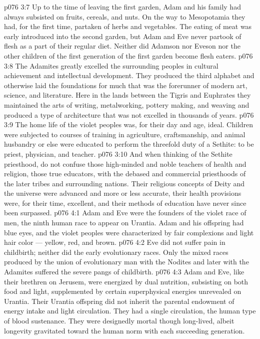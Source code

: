 \vs p076 3:7 Up to the time of leaving the first garden, Adam and his family had always subsisted on fruits, cereals, and nuts. On the way to Mesopotamia they had, for the first time, partaken of herbs and vegetables. The eating of meat was early introduced into the second garden, but Adam and Eve never partook of flesh as a part of their regular diet. Neither did Adamson nor Eveson nor the other children of the first generation of the first garden become flesh eaters.
\vs p076 3:8 \pc The Adamites greatly excelled the surrounding peoples in cultural achievement and intellectual development. They produced the third alphabet and otherwise laid the foundations for much that was the forerunner of modern art, science, and literature. Here in the lands between the Tigris and Euphrates they maintained the arts of writing, metalworking, pottery making, and weaving and produced a type of architecture that was not excelled in thousands of years.
\vs p076 3:9 The home life of the violet peoples was, for their day and age, ideal. Children were subjected to courses of training in agriculture, craftsmanship, and animal husbandry or else were educated to perform the threefold duty of a Sethite: to be priest, physician, and teacher.
\vs p076 3:10 And when thinking of the Sethite priesthood, do not confuse those high\hyp{}minded and noble teachers of health and religion, those true educators, with the debased and commercial priesthoods of the later tribes and surrounding nations. Their religious concepts of Deity and the universe were advanced and more or less accurate, their health provisions were, for their time, excellent, and their methods of education have never since been surpassed.
\vs p076 4:1 Adam and Eve were the founders of the violet race of men, the ninth human race to appear on Urantia. Adam and his offspring had blue eyes, and the violet peoples were characterized by fair complexions and light hair color --- yellow, red, and brown.
\vs p076 4:2 Eve did not suffer pain in childbirth; neither did the early evolutionary races. Only the mixed races produced by the union of evolutionary man with the Nodites and later with the Adamites suffered the severe pangs of childbirth.
\vs p076 4:3 Adam and Eve, like their brethren on Jerusem, were energized by dual nutrition, subsisting on both food and light, supplemented by certain superphysical energies unrevealed on Urantia. Their Urantia offspring did not inherit the parental endowment of energy intake and light circulation. They had a single circulation, the human type of blood sustenance. They were designedly mortal though long\hyp{}lived, albeit longevity gravitated toward the human norm with each succeeding generation.
